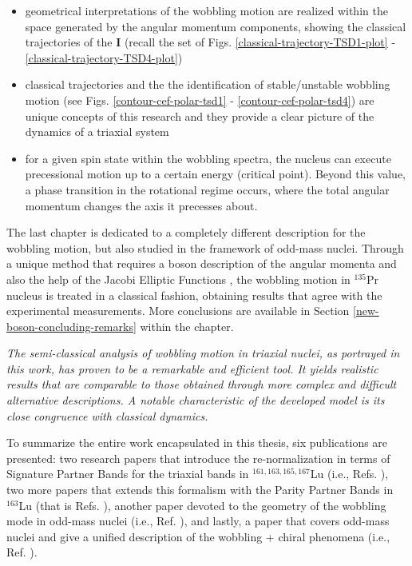 \begin{itemize}
    \item geometrical interpretations of the wobbling motion are realized within the space generated by the angular momentum components, showing the classical trajectories of the $\mathbf{I}$ (recall the set of Figs. \ref{classical-trajectory-TSD1-plot} - \ref{classical-trajectory-TSD4-plot})
    \item classical trajectories and the the identification of stable/unstable wobbling motion (see Figs. \ref{contour-cef-polar-tsd1} - \ref{contour-cef-polar-tsd4}) are unique concepts of this research and they provide a clear picture of the dynamics of a triaxial system
    \item for a given spin state within the wobbling spectra, the nucleus can execute precessional motion up to a certain energy (critical point). Beyond this value, a phase transition in the rotational regime occurs, where the total angular momentum changes the axis it precesses about.
\end{itemize}

The last chapter is dedicated to a completely different description for the wobbling motion, but also studied in the framework of odd-mass nuclei. Through a unique method that requires a boson description of the angular momenta and also the help of the Jacobi Elliptic Functions \cite{jacobi1829fundamenta}, the wobbling motion in $^{135}$Pr nucleus is treated in a classical fashion, obtaining results that agree with the experimental measurements. More conclusions are available in Section \ref{new-boson-concluding-remarks} within the chapter.

\emph{The semi-classical analysis of wobbling motion in triaxial nuclei, as portrayed in this work, has proven to be a remarkable and efficient tool. It yields realistic results that are comparable to those obtained through more complex and difficult alternative descriptions. A notable characteristic of the developed model is its close congruence with classical dynamics.}

To summarize the entire work encapsulated in this thesis, six publications are presented: two research papers that introduce the re-normalization in terms of Signature Partner Bands for the triaxial bands in $^{161,163,165,167}$Lu (i.e., Refs. \cite{raduta2020approach,raduta2020towards}), two more papers that extends this formalism with the Parity Partner Bands in $^{163}$Lu (that is Refs. \cite{poenaru2021parity,poenaru2021extensive1}), another paper devoted to the geometry of the wobbling mode in odd-mass nuclei (i.e., Ref. \cite{poenaru2021extensive2}), and lastly, a paper that covers odd-mass nuclei and give a unified description of the wobbling + chiral phenomena (i.e., Ref. \cite{raduta2020new}). %

